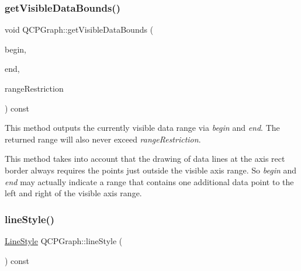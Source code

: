 \subsubsection{\texorpdfstring{get\+Visible\+Data\+Bounds()}{getVisibleDataBounds()}}
{\footnotesize\ttfamily void Q\+C\+P\+Graph\+::get\+Visible\+Data\+Bounds (\begin{DoxyParamCaption}\item[{\hyperlink{class_q_c_p_data_container_ae40a91f5cb0bcac61d727427449b7d15}{Q\+C\+P\+Graph\+Data\+Container\+::const\+\_\+iterator} \&}]{begin,  }\item[{\hyperlink{class_q_c_p_data_container_ae40a91f5cb0bcac61d727427449b7d15}{Q\+C\+P\+Graph\+Data\+Container\+::const\+\_\+iterator} \&}]{end,  }\item[{const \hyperlink{class_q_c_p_data_range}{Q\+C\+P\+Data\+Range} \&}]{range\+Restriction }\end{DoxyParamCaption}) const\hspace{0.3cm}{\ttfamily [protected]}}

This method outputs the currently visible data range via {\itshape begin} and {\itshape end}. The returned range will also never exceed {\itshape range\+Restriction}.

This method takes into account that the drawing of data lines at the axis rect border always requires the points just outside the visible axis range. So {\itshape begin} and {\itshape end} may actually indicate a range that contains one additional data point to the left and right of the visible axis range. \mbox{\label{class_q_c_p_graph_ac3e6f4b3387338df45992b47691b2551}} 
\subsubsection{\texorpdfstring{line\+Style()}{lineStyle()}}
{\footnotesize\ttfamily \hyperlink{class_q_c_p_graph_ad60175cd9b5cac937c5ee685c32c0859}{Line\+Style} Q\+C\+P\+Graph\+::line\+Style (\begin{DoxyParamCaption}{ }\end{DoxyParamCaption}) const\hspace{0.3cm}{\ttfamily [inline]}}

\mbox{\label{class_q_c_p_graph_a89acf99c0b52b8eecb2438adf7ec0170}} 

